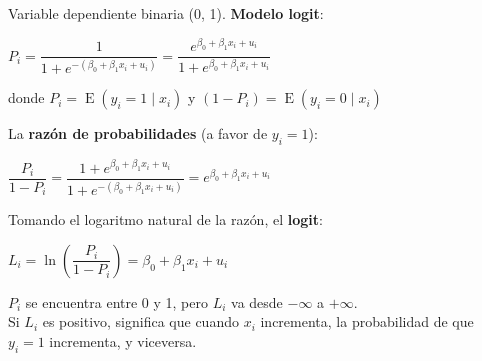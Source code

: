 \documentclass[10pt, a4paper, landscape]{article}
\DeclareMathOperator{\E}{E}
\begin{document}
\begin{multicols}{3}
Variable dependiente binaria (0, 1). \textbf{Modelo logit}:

\begin{center}
	\( P_{i} = \dfrac{1}{1 + e^{-(\beta_{0} + \beta_{1} x_{i} + u_{i})}}= \dfrac{e^{\beta_{0} + \beta_{1} x_{i} + u_{i}}}{1 + e^{\beta_{0} + \beta_{1} x_{i} + u_{i}}} \)
\end{center}

donde \( P_{i} = \E(y_{i} = 1 \mid x_{i}) \) y \( (1 - P_{i}) = \E(y_{i} = 0 \mid x_{i}) \)

La \textbf{razón de probabilidades} (a favor de \( y_{i} = 1 \)):

\begin{center}
	\( \dfrac{P_{i}}{1 - P_{i}} = \dfrac{1 + e^{\beta_{0} + \beta_{1} x_{i} + u_{i}}}{1 + e^{-(\beta_{0} + \beta_{1} x_{i} + u_{i})}} = e^{\beta_{0} + \beta_{1} x_{i} + u_{i}} \)
\end{center}

Tomando el logaritmo natural de la razón, el \textbf{logit}:

\begin{center}
	\( L_{i} = \ln \left( \dfrac{P_i}{1 - P_i}\right) = \beta_{0} + \beta_{1} x_{i} + u_{i} \)
\end{center}

\setlength{\multicolsep}{6pt}
\begin{multicols}{2}

\( P_{i} \) se encuentra entre 0 y 1, pero \( L_{i} \) va desde \( -\infty \) a \( +\infty \). \\

Si \( L_{i} \) es positivo, significa que cuando \( x_{i} \) incrementa, la probabilidad de que \( y_{i} = 1 \) incrementa, y viceversa.

\columnbreak


\end{multicols}


\end{multicols}
\end{document}
